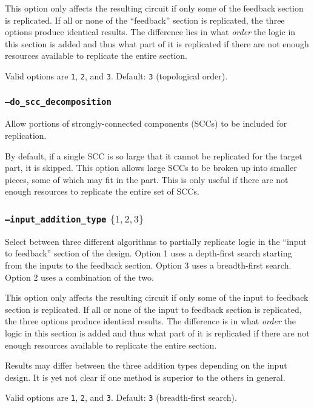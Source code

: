 This option only affects the resulting circuit if only some of the feedback 
section is replicated. If all or none of the ``feedback'' section is 
replicated, the three options produce identical results. The difference lies 
in what \emph{order} the logic in this section is added and thus what part of 
it is replicated if there are not enough resources available to replicate the 
entire section.

Valid options are \texttt{1}, \texttt{2}, and \texttt{3}. Default: \texttt{3}
(topological order).

\subsubsection{\texttt{--do\_scc\_decomposition}}
Allow portions of strongly-connected components (SCCs) to be included for 
replication. 

By default, if a single SCC is so large that it cannot be replicated for the 
target part, it is skipped. This option allows large SCCs to be broken up into 
smaller pieces, some of which may fit in the part. This is only useful if there 
are not enough resources to replicate the entire set of SCCs.

\subsubsection{\texttt{--input\_addition\_type} $\{1,2,3\}$}
Select between three different algorithms to partially replicate logic in the 
``input to feedback'' section of the design. Option 1 uses a depth-first search 
starting from the inputs to the feedback section. Option 3 uses a breadth-first 
search. Option 2 uses a combination of the two.

This option only affects the resulting circuit if only some of the input
to feedback section is replicated. If all or none of the input to feedback 
section is replicated, the three options produce identical results. The 
difference is in what \emph{order} the logic in this section is added and thus 
what part of it is replicated if there are not enough resources available to 
replicate the entire section.

Results may differ between the three addition types depending on the input 
design. It is yet not clear if one method is superior to the others in general. 

Valid options are \texttt{1}, \texttt{2}, and \texttt{3}. Default: \texttt{3} 
(breadth-first search).

